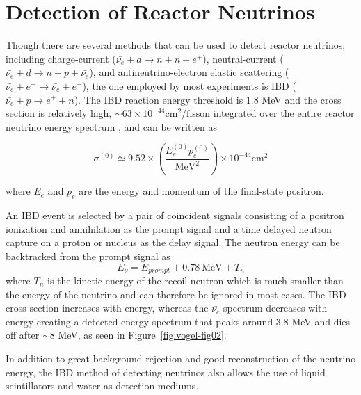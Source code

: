 \section{Detection of Reactor Neutrinos}

Though there are several methods that can be used to detect reactor neutrinos, including charge-current ($\bar{\nu_e} + d \rightarrow n + n + e^+$), neutral-current ($\bar{\nu_e} + d \rightarrow n + p + \bar{\nu_e}$), and antineutrino-electron elastic scattering ($\bar{\nu_e} + e^- \rightarrow \bar{\nu_e} + e^-$), the one employed by most experiments is IBD ($\bar{\nu_e} + p \rightarrow e^+ + n$).
The IBD reaction energy threshold is 1.8 MeV and the cross section is relatively high, $\sim 63 \times 10^{-44} \textrm{cm}^2/\textrm{fisson}$ integrated over the entire reactor neutrino energy spectrum \cite{Qian:2018wid}, and can be written as

\begin{equation}
	\sigma^{(0)} \simeq 9.52 \times \left(\frac{E_e^{(0)}p_e^{(0)}}{\textrm{MeV}^2}\right) \times 10^{-44}\textrm{cm}^2
\end{equation}

where $E_e$ and $p_e$ are the energy and momentum of the final-state positron. 

An IBD event is selected by a pair of coincident signals consisting of a positron ionization and annihilation as the prompt signal and a time delayed neutron capture on a proton or nucleus as the delay signal. 
The neutron energy can be backtracked from the prompt signal as
\begin{equation}	
	E_{\bar{\nu}} = E_{prompt} + 0.78~\textrm{MeV} + T_n
\end{equation}
where $T_n$ is the kinetic energy of the recoil neutron which is much smaller than the energy of the neutrino and can therefore be ignored in most cases. 
The IBD cross-section increases with energy, whereas the $\bar{\nu_{e}}$ spectrum decreases with energy creating a detected energy spectrum that peaks around 3.8 MeV and dies off after $\sim$8 MeV, as seen in Figure~\ref{fig:vogel-fig02}. 

In addition to great background rejection and good reconstruction of the neutrino energy, the IBD method of detecting neutrinos also allows the use of liquid scintillators and water as detection mediums. 

